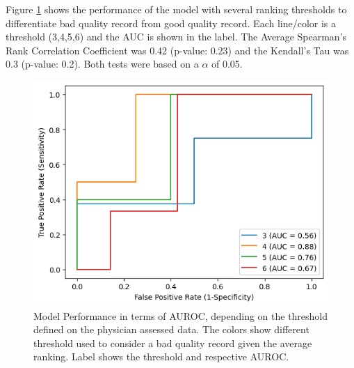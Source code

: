 Figure \ref{fig:auc_changes} shows the performance of the model with several ranking thresholds to differentiate bad quality record from good quality record. Each line/color is a threshold (3,4,5,6) and the AUC is shown in the label. The Average Spearman's Rank Correlation Coefficient was 0.42 (p-value: 0.23) and the Kendall's Tau was 0.3 (p-value: 0.2). Both tests were based on a $\alpha$ of 0.05.

\begin{figure}[htbp]
    \centering
    \caption{Model Performance in terms of AUROC, depending on the threshold defined on the physician assessed data. The colors show different threshold used to consider a bad quality record given the average ranking. Label shows the threshold and respective AUROC.}\label{fig:auc_changes} 
    \includegraphics[scale=0.78]{figures/auroc_curve_threshold.png}
    \end{figure}
